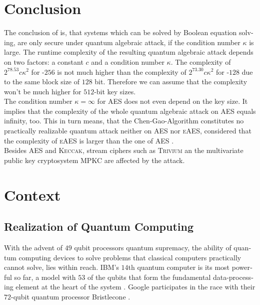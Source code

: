 \documentclass[a4paper,11pt]{article}
\begin{document}
\begin{otherlanguage}{english}
\section{Conclusion}

\noindent
The conclusion of \cite{QAA} is, that systems which can be solved by Boolean equation solving, are only secure under quantum algebraic attack, if the condition number $\kappa$ is large. The runtime complexity of the resulting quantum algebraic attack depends on two factors: a constant $c$ and a condition number $\kappa$. The complexity of $2^{78.53}c\kappa^2$ for -$256$ is not much higher than the complexity of $2^{73.30}c\kappa^2$ for -$128$ due to the same block size of $128$ bit. Therefore we can assume that the complexity won't be much higher for $512$-bit key sizes.\\

\noindent
The condition number $\kappa = \infty$ for \textsc{AES} does not even depend on the key size. It implies that the complexity of the whole quantum algebraic attack on \textsc{AES} equals infinity, too. 
This in turn means, that the Chen-Gao-Algorithm constitutes no practically realizable quantum attack neither on \textsc{AES} nor \textsc{eAES}, considered that the complexity of \textsc{eAES} is larger than 
the one of \textsc{AES} \cite{BUK}. \\

\noindent
Besides \textsc{AES} and \textsc{Keccak}, stream ciphers such as \textsc{Trivium} an the multivariate public key cryptosystem \textsc{MPKC} are affected by the attack. \\


\section{Context}

\subsection{Realization of Quantum Computing}

\noindent
With the advent of $49$ qubit processors quantum supremacy, the ability of quantum computing devices to solve problems that classical computers practically cannot solve,  lies within reach. IBM's $14$th quantum computer is its most powerful so far, a model with $53$ of the qubits that form the fundamental data-processing element at the heart of the system \cite{MSN}. Google participates in the race with their $72$-qubit quantum processor Bristlecone \cite{googleai}. \\


\end{otherlanguage}
\end{document}
